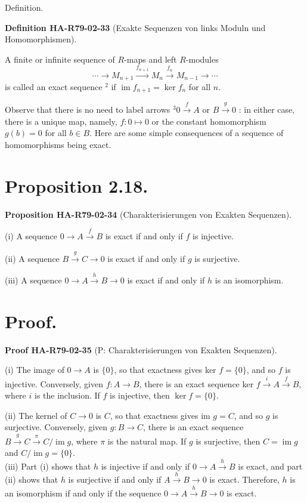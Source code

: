 \documentclass[10pt, letterpaper]{article}
\newcommand{\CustomHeading}[3]{%
  \par\medskip\noindent%
  \textbf{#1 #2} \textnormal{(#3)}.\enskip%
}
\newenvironment{DEF}[2]{\begin{unitbox}\CustomHeading{Definition}{#1}{#2}}{\end{unitbox}}
\newenvironment{PROP}[2]{\begin{unitbox}\CustomHeading{Proposition}{#1}{#2}}{\end{unitbox}}
\newenvironment{PROOF}[2]{\begin{unitbox}\CustomHeading{Proof}{#1}{#2}}{\end{unitbox}}
\begin{document}
Definition. 

\begin{DEF}{HA-R79-02-33}{Exakte Sequenzen von links Moduln und Homomorphismen}
A finite or infinite sequence of $R$-maps and left $R$-modules
$$
\cdots \rightarrow M_{n+1} \xrightarrow{f_{n+1}} M_{n} \xrightarrow{f_{n}} M_{n-1} \rightarrow \cdots
$$
is called an exact sequence $^{2}$ if $\operatorname{im} f_{n+1}=\operatorname{ker} f_{n}$ for all $n$.
\end{DEF}


Observe that there is no need to label arrows ${ }^{3} 0 \xrightarrow{f} A$ or $B \xrightarrow{g} 0$ : in either case, there is a unique map, namely, $f: 0 \mapsto 0$ or the constant homomorphism $g(b)=0$ for all $b \in B$. Here are some simple consequences of a sequence of homomorphisms being exact.

\section*{Proposition 2.18.}

\begin{PROP}{HA-R79-02-34}{Charakterisierungen von Exakten Sequenzen}
(i) A sequence $0 \rightarrow A \xrightarrow{f} B$ is exact if and only if $f$ is injective.

(ii) A sequence $B \xrightarrow{g} C \rightarrow 0$ is exact if and only if $g$ is surjective.

(iii) A sequence $0 \rightarrow A \xrightarrow{h} B \rightarrow 0$ is exact if and only if $h$ is an isomorphism.
\end{PROP}

\section*{Proof.}

\begin{PROOF}{HA-R79-02-35}{P: Charakterisierungen von Exakten Sequenzen}
(i) The image of $0 \rightarrow A$ is $\{0\}$, so that exactness gives ker $f=\{0\}$, and so $f$ is injective. Conversely, given $f: A \rightarrow B$, there is an exact sequence ker $f \xrightarrow{i} A \xrightarrow{f} B$, where $i$ is the inclusion. If $f$ is injective, then $\operatorname{ker} f=\{0\}$.

(ii) The kernel of $C \rightarrow 0$ is $C$, so that exactness gives im $g=C$, and so $g$ is surjective. Conversely, given $g: B \rightarrow C$, there is an exact sequence $B \xrightarrow{g} C \xrightarrow{\pi} C / \operatorname{im} g$, where $\pi$ is the natural map. If $g$ is surjective, then $C=\operatorname{im} g$ and $C / \operatorname{im} g=\{0\}$.\\


(iii) Part (i) shows that $h$ is injective if and only if $0 \rightarrow A \xrightarrow{h} B$ is exact, and part (ii) shows that $h$ is surjective if and only if $A \xrightarrow{h} B \rightarrow 0$ is exact. Therefore, $h$ is an isomorphism if and only if the sequence $0 \rightarrow A \xrightarrow{h} B \rightarrow 0$ is exact.
\end{PROOF}
\end{document}
